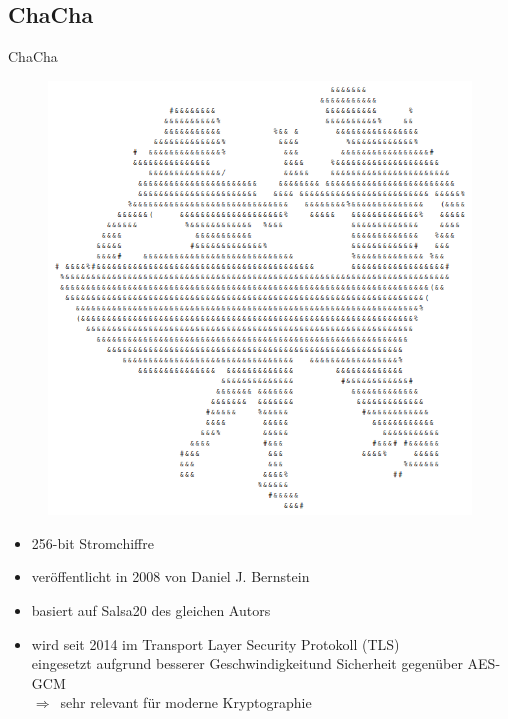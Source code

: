 \documentclass{beamer}
\begin{document}
\subsection{ChaCha}
\begin{frame}{ChaCha}
\renewcommand*{\thefootnote}{\fnsymbol{footnote}}
\begin{figure}
\center
\begin{minipage}{.25\textwidth}
\includegraphics[width=\textwidth]{figures/chacha-ascii-art/chacha-ascii-art.png}
\end{minipage}
\end{figure}
\begin{itemize}
\item 256-bit Stromchiffre
\item veröffentlicht in 2008 von Daniel J. Bernstein
\item basiert auf Salsa20 des gleichen Autors
\item wird seit 2014 im Transport Layer Security Protokoll (TLS) \\eingesetzt aufgrund besserer Geschwindigkeit\footnotemark und Sicherheit gegenüber AES-GCM\\ $\Rightarrow$\ sehr relevant für moderne Kryptographie
\end{itemize}
\end{frame}
\end{document}
